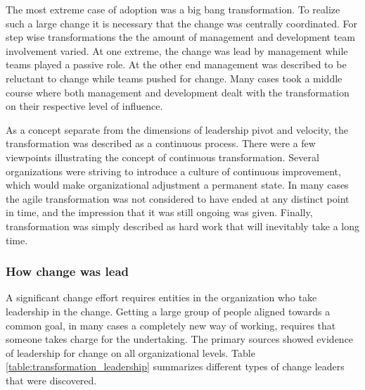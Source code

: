 \documentclass[preprint,authoryear,12pt]{elsarticle}
\begin{document}
The most extreme case of adoption was a big bang transformation. To realize such
a large change it is necessary that the change was centrally coordinated.
For step wise transformations the the amount of management and development team
involvement varied. At one extreme, the change was lead by management while
teams played a passive role. At the other end management was described to be
reluctant to change while teams pushed for change. Many cases took a middle
course where both management and development dealt with the transformation on
their respective level of influence.

As a concept separate from the dimensions of leadership pivot and velocity, the
transformation was described as a continuous process. There were a few
viewpoints illustrating the concept of continuous transformation. Several
organizations were striving to introduce a culture of continuous improvement,
which would make organizational adjustment a permanent state. In many cases the
agile transformation was not considered to have ended at any distinct point in
time, and the impression that it was still ongoing was given. Finally,
transformation was simply described as hard work that will inevitably take a
long time.















\subsubsection{How change was lead}

A significant change effort requires entities in the organization who take
leadership in the change. Getting a large group of people aligned towards a
common goal, in many cases a completely new way of working, requires that
someone takes charge for the undertaking. The primary sources showed evidence of
leadership for change on all organizational levels. Table
\ref{table:transformation_leadership} summarizes different types of change
leaders that were discovered.
\end{document}
